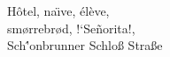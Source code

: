 \documentclass{article}
\begin{document}
H\^otel, na\"\i ve, \'el\`eve,\\
sm\o rrebr\o d, !`Se\~norita!,\\
Sch\''onbrunner Schlo\ss{}
Stra\ss e
\end{document}
